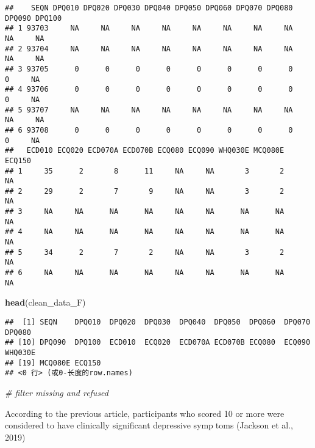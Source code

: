 \documentclass[
]{article}
\newenvironment{Shaded}{\begin{snugshade}}{\end{snugshade}}
\newcommand{\CommentTok}[1]{\textcolor[rgb]{0.56,0.35,0.01}{\textit{#1}}}
\newcommand{\FunctionTok}[1]{\textcolor[rgb]{0.13,0.29,0.53}{\textbf{#1}}}
\newcommand{\NormalTok}[1]{#1}
\begin{document}
\begin{verbatim}
##    SEQN DPQ010 DPQ020 DPQ030 DPQ040 DPQ050 DPQ060 DPQ070 DPQ080 DPQ090 DPQ100
## 1 93703     NA     NA     NA     NA     NA     NA     NA     NA     NA     NA
## 2 93704     NA     NA     NA     NA     NA     NA     NA     NA     NA     NA
## 3 93705      0      0      0      0      0      0      0      0      0     NA
## 4 93706      0      0      0      0      0      0      0      0      0     NA
## 5 93707     NA     NA     NA     NA     NA     NA     NA     NA     NA     NA
## 6 93708      0      0      0      0      0      0      0      0      0     NA
##   ECD010 ECQ020 ECD070A ECD070B ECQ080 ECQ090 WHQ030E MCQ080E ECQ150
## 1     35      2       8      11     NA     NA       3       2     NA
## 2     29      2       7       9     NA     NA       3       2     NA
## 3     NA     NA      NA      NA     NA     NA      NA      NA     NA
## 4     NA     NA      NA      NA     NA     NA      NA      NA     NA
## 5     34      2       7       2     NA     NA       3       2     NA
## 6     NA     NA      NA      NA     NA     NA      NA      NA     NA
\end{verbatim}

\begin{Shaded}
\begin{Highlighting}[]
\FunctionTok{head}\NormalTok{(clean\_data\_F)}
\end{Highlighting}
\end{Shaded}

\begin{verbatim}
##  [1] SEQN    DPQ010  DPQ020  DPQ030  DPQ040  DPQ050  DPQ060  DPQ070  DPQ080 
## [10] DPQ090  DPQ100  ECD010  ECQ020  ECD070A ECD070B ECQ080  ECQ090  WHQ030E
## [19] MCQ080E ECQ150 
## <0 行> (或0-长度的row.names)
\end{verbatim}

\begin{Shaded}
\begin{Highlighting}[]
\CommentTok{\# filter missing and refused}
\end{Highlighting}
\end{Shaded}

According to the previous article, participants who scored 10 or more
were considered to have clinically significant depressive symptoms
(Jackson et al., 2019)
\end{document}
